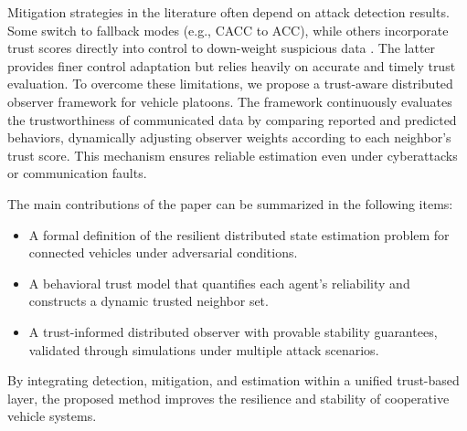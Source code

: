 \documentclass{ifacconf}
\begin{document}
%
Mitigation strategies in the literature often depend on attack detection results. Some switch to fallback modes (e.g., CACC to ACC), while others incorporate trust scores directly into control to down-weight suspicious data \cite{self_belive,Enhancing_control_trust}. The latter provides finer control adaptation but relies heavily on accurate and timely trust evaluation. To overcome these limitations, we propose a trust-aware distributed observer framework for vehicle platoons. The framework continuously evaluates the trustworthiness of communicated data by comparing reported and predicted behaviors, dynamically adjusting observer weights according to each neighbor's trust score. This mechanism ensures reliable estimation even under cyberattacks or communication faults.

The main contributions of the paper can be summarized in the following items:
\begin{itemize}
    \item A formal definition of the resilient distributed state estimation problem for connected vehicles under adversarial conditions.
    \item A behavioral trust model that quantifies each agent's reliability and constructs a dynamic trusted neighbor set.
    \item A trust-informed distributed observer with provable stability guarantees, validated through simulations under multiple attack scenarios.
\end{itemize}

By integrating detection, mitigation, and estimation within a unified trust-based layer, the proposed method improves the resilience and stability of cooperative vehicle systems.


\end{document}
